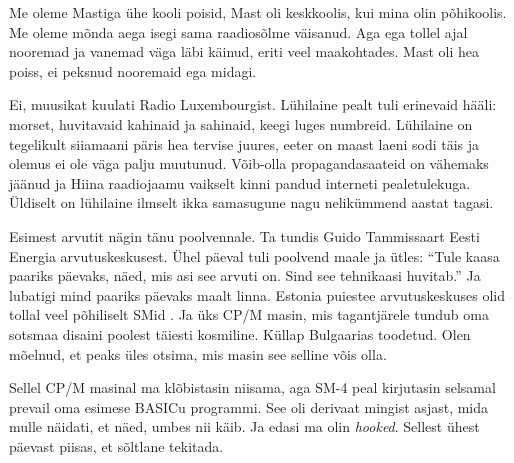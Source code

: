 
Me oleme Mastiga ühe kooli poisid, Mast oli keskkoolis, kui mina olin 
põhikoolis. Me oleme mõnda aega isegi sama 
raadiosõlme väisanud. Aga ega tollel ajal nooremad ja vanemad väga läbi käinud, 
eriti veel 
maakohtades. Mast oli hea 
poiss, ei peksnud nooremaid ega midagi. 


Ei, muusikat kuulati Radio Luxembourgist. Lühilaine pealt tuli erinevaid 
hääli: morset, huvitavaid kahinaid ja sahinaid, keegi 
luges numbreid. Lühilaine on tegelikult siiamaani päris hea tervise 
juures, eeter on maast laeni sodi täis ja olemus 
ei ole väga palju muutunud. Võib-olla propagandasaateid on vähemaks 
jäänud ja Hiina raadiojaamu vaikselt kinni pandud  
interneti pealetulekuga. Üldiselt on lühilaine ilmselt ikka samasugune nagu 
nelikümmend aastat tagasi.


Esimest arvutit nägin tänu poolvennale. Ta tundis Guido 
Tammissaart Eesti Energia 
arvutuskeskusest. Ühel 
päeval tuli poolvend maale ja ütles: \enquote{Tule kaasa paariks päevaks, näed, 
mis asi 
see arvuti on. Sind see tehnikaasi huvitab.} Ja lubatigi mind paariks päevaks 
maalt 
linna. Estonia puiestee arvutuskeskuses olid tollal veel põhiliselt 
SMid . Ja 
üks CP/M 
masin, mis tagantjärele tundub oma sotsmaa disaini poolest täiesti kosmiline. 
Küllap Bulgaarias toodetud. Olen mõelnud, et 
peaks üles otsima, mis masin see selline võis olla. 

Sellel CP/M masinal ma klõbistasin niisama, aga 
SM-4 peal 
kirjutasin selsamal prevail oma esimese BASICu programmi. 
See oli derivaat mingist asjast, mida mulle näidati, et näed, umbes nii 
käib. Ja edasi ma olin \emph{hooked}. Sellest ühest päevast piisas, et sõltlane 
tekitada. 

